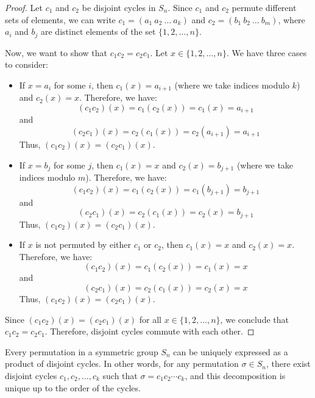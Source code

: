 \documentclass[openany]{book}
\begin{document}
\begin{proof}
    Let \( c_1 \) and \( c_2 \) be disjoint cycles in \( S_n \). Since \( c_1 \) and \( c_2 \) permute different sets of elements, we can write \( c_1 = (a_1\ a_2\ \ldots\ a_k) \) and \( c_2 = (b_1\ b_2\ \ldots\ b_m) \), where \( a_i \) and \( b_j \) are distinct elements of the set \( \{1, 2, \ldots, n\} \). 

    Now, we want to show that \( c_1 c_2 = c_2 c_1 \). Let \( x \in \{1, 2, \ldots, n\} \). We have three cases to consider:
    \begin{itemize}
        \item If \( x = a_i \) for some \( i \), then \( c_1(x) = a_{i+1} \) (where we take indices modulo \( k \)) and \( c_2(x) = x \). Therefore, we have:
        \[
        (c_1 c_2)(x) = c_1(c_2(x)) = c_1(x) = a_{i+1}
        \]
        and
        \[
        (c_2 c_1)(x) = c_2(c_1(x)) = c_2(a_{i+1}) = a_{i+1}
        \]
        Thus, \( (c_1 c_2)(x) = (c_2 c_1)(x) \).
        
        \item If \( x = b_j \) for some \( j \), then \( c_1(x) = x \) and \( c_2(x) = b_{j+1} \) (where we take indices modulo \( m \)). Therefore, we have:
        \[
        (c_1 c_2)(x) = c_1(c_2(x)) = c_1(b_{j+1}) = b_{j+1}
        \]
        and
        \[
        (c_2 c_1)(x) = c_2(c_1(x)) = c_2(x) = b_{j+1}
        \]
        Thus, \( (c_1 c_2)(x) = (c_2 c_1)(x) \).
        \item If \( x \) is not permuted by either \( c_1 \) or \( c_2 \), then \( c_1(x) = x \) and \( c_2(x) = x \). Therefore, we have:
        \[
        (c_1 c_2)(x) = c_1(c_2(x)) = c_1(x) = x
        \]
        and
        \[
        (c_2 c_1)(x) = c_2(c_1(x)) = c_2(x) = x
        \]
        Thus, \( (c_1 c_2)(x) = (c_2 c_1)(x) \).
    \end{itemize}
    Since \( (c_1 c_2)(x) = (c_2 c_1)(x) \) for all \( x \in \{1, 2, \ldots, n\} \), we conclude that \( c_1 c_2 = c_2 c_1 \). Therefore, disjoint cycles commute with each other.
\end{proof}
\begin{mytheorem}
    Every permutation in a symmetric group \( S_n \) can be uniquely expressed as a product of disjoint cycles. In other words, for any permutation \( \sigma \in S_n \), there exist disjoint cycles \( c_1, c_2, \ldots, c_k \) such that \( \sigma = c_1 c_2 \cdots c_k \), and this decomposition is unique up to the order of the cycles.
\end{mytheorem}
\end{document}
